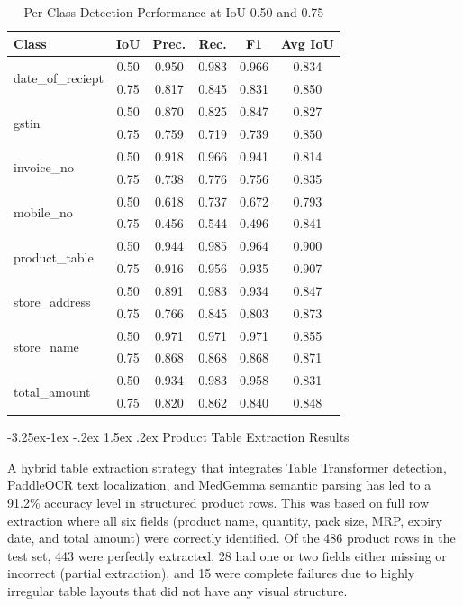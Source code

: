 \documentclass[conference,twocolumn]{IEEEtran}
\makeatletter
\renewcommand{\subsection}{\@startsection{subsection}{2}{\z@}%
  {-3.25ex\@plus -1ex \@minus -.2ex}%
  {1.5ex \@plus .2ex}%
  {\normalfont\normalsize\bfseries\itshape}}
\makeatother
\begin{document}
\begin{table}[htbp]
\caption{Per-Class Detection Performance at IoU 0.50 and 0.75}
\label{tab:perclass}
\centering
\scriptsize
\begin{tabular}{lccccc}
\toprule
Class & IoU & Prec. & Rec. & F1 & Avg IoU \\
\midrule
\multirow{2}{*}{date\_of\_reciept} & 0.50 & 0.950 & 0.983 & 0.966 & 0.834 \\
& 0.75 & 0.817 & 0.845 & 0.831 & 0.850 \\
\multirow{2}{*}{gstin} & 0.50 & 0.870 & 0.825 & 0.847 & 0.827 \\
& 0.75 & 0.759 & 0.719 & 0.739 & 0.850 \\
\multirow{2}{*}{invoice\_no} & 0.50 & 0.918 & 0.966 & 0.941 & 0.814 \\
& 0.75 & 0.738 & 0.776 & 0.756 & 0.835 \\
\multirow{2}{*}{mobile\_no} & 0.50 & 0.618 & 0.737 & 0.672 & 0.793 \\
& 0.75 & 0.456 & 0.544 & 0.496 & 0.841 \\
\multirow{2}{*}{product\_table} & 0.50 & 0.944 & 0.985 & 0.964 & 0.900 \\
& 0.75 & 0.916 & 0.956 & 0.935 & 0.907 \\
\multirow{2}{*}{store\_address} & 0.50 & 0.891 & 0.983 & 0.934 & 0.847 \\
& 0.75 & 0.766 & 0.845 & 0.803 & 0.873 \\
\multirow{2}{*}{store\_name} & 0.50 & 0.971 & 0.971 & 0.971 & 0.855 \\
& 0.75 & 0.868 & 0.868 & 0.868 & 0.871 \\
\multirow{2}{*}{total\_amount} & 0.50 & 0.934 & 0.983 & 0.958 & 0.831 \\
& 0.75 & 0.820 & 0.862 & 0.840 & 0.848 \\
\bottomrule
\end{tabular}
\end{table}

\subsection{Product Table Extraction Results}

A hybrid table extraction strategy that integrates Table Transformer
detection, PaddleOCR text localization, and MedGemma semantic parsing
has led to a 91.2\% accuracy level in structured product rows. This was
based on full row extraction where all six fields (product name,
quantity, pack size, MRP, expiry date, and total amount) were correctly
identified. Of the 486 product rows in the test set, 443 were perfectly
extracted, 28 had one or two fields either missing or incorrect (partial
extraction), and 15 were complete failures due to highly irregular table
layouts that did not have any visual structure.
\end{document}
